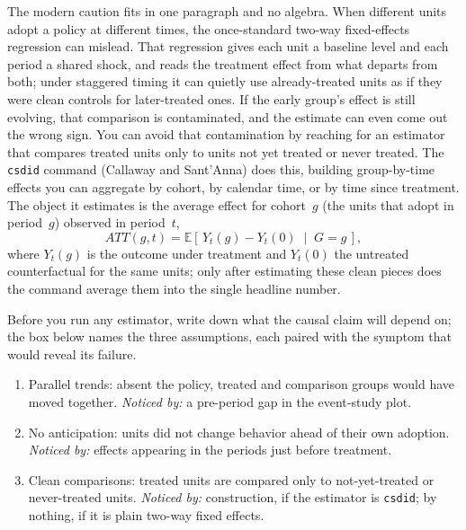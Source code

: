 \documentclass[
    a4paper,
    fontsize=10pt,
    twoside=true,
    numbers=noenddot,
]{kaobook}
\newenvironment{restson}[1][What this depends on]{%
    \begin{restsonbox}[frametitle={#1}]%
}{%
    \end{restsonbox}%
}
\begin{document}
The modern caution fits in one paragraph and no algebra. When different units adopt a policy at different times, the once-standard two-way fixed-effects regression can mislead. That regression gives each unit a baseline level and each period a shared shock, and reads the treatment effect from what departs from both; under staggered timing it can quietly use already-treated units as if they were clean controls for later-treated ones. If the early group's effect is still evolving, that comparison is contaminated, and the estimate can even come out the wrong sign. You can avoid that contamination by reaching for an estimator that compares treated units only to units not yet treated or never treated. The \texttt{csdid} command (Callaway and Sant'Anna) does this, building group-by-time effects you can aggregate by cohort, by calendar time, or by time since treatment. The object it estimates is the average effect for cohort~$g$ (the units that adopt in period~$g$) observed in period~$t$,
\[
ATT(g,t)=\mathbb{E}\!\left[\,Y_t(g)-Y_t(0)\;\middle|\;G=g\,\right],
\]
where $Y_t(g)$ is the outcome under treatment and $Y_t(0)$ the untreated counterfactual for the same units; only after estimating these clean pieces does the command average them into the single headline number.

Before you run any estimator, write down what the causal claim will depend on; the box below names the three assumptions, each paired with the symptom that would reveal its failure.

\begin{restson}[What the DiD claim depends on]
\begin{enumerate}
\item Parallel trends: absent the policy, treated and comparison groups would have moved together. \emph{Noticed by:} a pre-period gap in the event-study plot.
\item No anticipation: units did not change behavior ahead of their own adoption. \emph{Noticed by:} effects appearing in the periods just before treatment.
\item Clean comparisons: treated units are compared only to not-yet-treated or never-treated units. \emph{Noticed by:} construction, if the estimator is \texttt{csdid}; by nothing, if it is plain two-way fixed effects.
\end{enumerate}
\end{restson}
\end{document}
